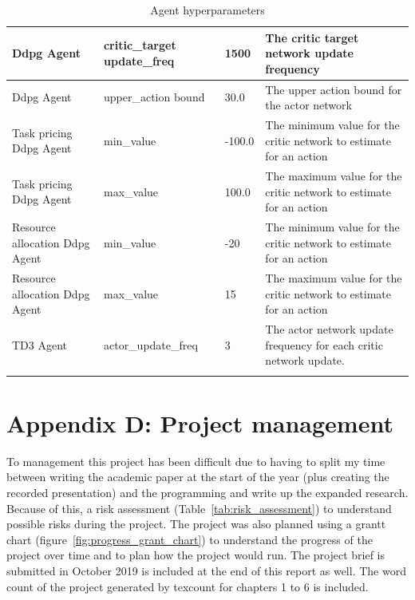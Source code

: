 \begin{longtable}{|p{2cm}|p{3.5cm}|p{2.5cm}|p{6cm}|}
        Ddpg Agent & critic\_target update\_freq & 1500 & The critic target network update frequency \\ \hline
        Ddpg Agent & upper\_action bound & 30.0 & The upper action bound for the actor network \\ \hline
        Task pricing Ddpg Agent & min\_value & -100.0 & The minimum value for the critic network to estimate for an
            action \\ \hline
        Task pricing Ddpg Agent & max\_value & 100.0 & The maximum value for the critic network to estimate for an
            action\\ \hline
        Resource allocation Ddpg Agent & min\_value & -20 & The minimum value for the critic network to estimate for an
            action \\ \hline
        Resource allocation Ddpg Agent & max\_value & 15 & The maximum value for the critic network to estimate for an
            action\\ \hline
        TD3 Agent & actor\_update\_freq & 3 & The actor network update frequency for each critic network update. \\ \hline
    \caption{Agent hyperparameters}
    \label{tab:agent_hyperparameters}
\end{longtable}

\section*{Appendix D: Project management} \label{app:project-management}
To management this project has been difficult due to having to split my time between writing the academic paper at the
start of the year (plus creating the recorded presentation) and the programming and write up the expanded research.
Because of this, a risk assessment (Table~\ref{tab:risk_assessment}) to understand possible risks during the project.
The project was also planned using a grantt chart (figure~\ref{fig:progress_grant_chart}) to understand the progress of
the project over time and to plan how the project would run. The project brief is submitted in October 2019
is included at the end of this report as well. The word count of the project generated by texcount for chapters 1 to 6
is included.

